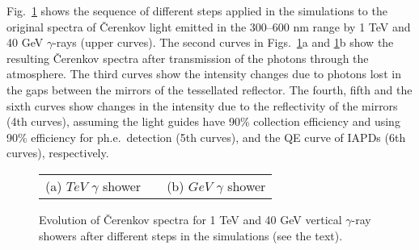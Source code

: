 Fig.~\ref{spectra:fig} shows the sequence of different steps applied
in the simulations to the original spectra of \v{C}erenkov light
emitted in the 300--600 nm range by 1 TeV and 40 GeV $\gamma$-rays
(upper curves).  The second curves in Figs.~\ref{spectra:fig}a and
\ref{spectra:fig}b show the resulting \v{C}erenkov spectra after
transmission of the photons through the atmosphere.  The third curves
show the intensity changes due to photons lost in the gaps between the
mirrors of the tessellated reflector. The fourth, fifth and the sixth
curves show changes in the intensity due to the reflectivity of the
mirrors (4th curves), assuming the light guides have 90\% collection
efficiency and using 90\% efficiency for ph.e.\ detection (5th
curves), and the QE curve of IAPDs (6th curves), respectively.
%               
\begin{figure}[h]
 \begin{center}
  \small{
  \begin{tabular}{ccc}
   (a)\quad 1 $TeV$ $\gamma$ shower&\qquad\qquad&(b)\quad 40 $GeV$ $\gamma$ shower
  \end{tabular}}
 \end{center}
 \centering
 \caption{Evolution of \v{C}erenkov spectra for 1 TeV and 40 GeV vertical 
$\gamma$-ray showers after different steps in the simulations (see the
text).}
 \label{spectra:fig}
\end{figure}

%
